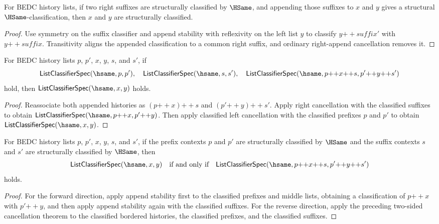 \begin{theorem}
\label{thm:list-classifier-append-right-cancel-with-hsame-suffix}
For BEDC history lists, if two right suffixes are structurally classified by
\(\HSame\), and appending those suffixes to \(x\) and \(y\) gives a structural
\(\HSame\)-classification, then \(x\) and \(y\) are structurally classified.
\end{theorem}
\begin{proof}
Use symmetry on the suffix classifier and append stability with reflexivity on
the left list \(y\) to classify \(y{++}\mathit{suffix}'\) with
\(y{++}\mathit{suffix}\). Transitivity aligns the appended classification to a
common right suffix, and ordinary right-append cancellation removes it.
\end{proof}

\begin{theorem}
\label{thm:list-classifier-append-two-sided-cancel-classified}
For BEDC history lists $p$, $p'$, $x$, $y$, $s$, and $s'$, if
$$
  \mathsf{ListClassifierSpec}(\hsame,p,p'),
  \quad
  \mathsf{ListClassifierSpec}(\hsame,s,s'),
  \quad
  \mathsf{ListClassifierSpec}(\hsame,p{++}x{++}s,p'{++}y{++}s')
$$
hold, then $\mathsf{ListClassifierSpec}(\hsame,x,y)$ holds.
\end{theorem}
\begin{proof}
Reassociate both appended histories as $(p{++}x){++}s$ and
$(p'{++}y){++}s'$. Apply right cancellation with the classified suffixes to
obtain $\mathsf{ListClassifierSpec}(\hsame,p{++}x,p'{++}y)$. Then apply
classified left cancellation with the classified prefixes $p$ and $p'$ to
obtain $\mathsf{ListClassifierSpec}(\hsame,x,y)$.
\end{proof}

\begin{theorem}
\label{thm:list-classifier-hsame-append-context-iff}
For BEDC history lists $p$, $p'$, $x$, $y$, $s$, and $s'$, if the prefix
contexts $p$ and $p'$ are structurally classified by $\HSame$ and the suffix
contexts $s$ and $s'$ are structurally classified by $\HSame$, then
$$
  \mathsf{ListClassifierSpec}(\hsame,x,y)
  \quad\text{if and only if}\quad
  \mathsf{ListClassifierSpec}(\hsame,p{++}x{++}s,p'{++}y{++}s')
$$
holds.
\end{theorem}
\begin{proof}
For the forward direction, apply append stability first to the classified
prefixes and middle lists, obtaining a classification of $p{++}x$ with
$p'{++}y$, and then apply append stability again with the classified suffixes.
For the reverse direction, apply the preceding two-sided cancellation theorem
to the classified bordered histories, the classified prefixes, and the
classified suffixes.
\end{proof}

